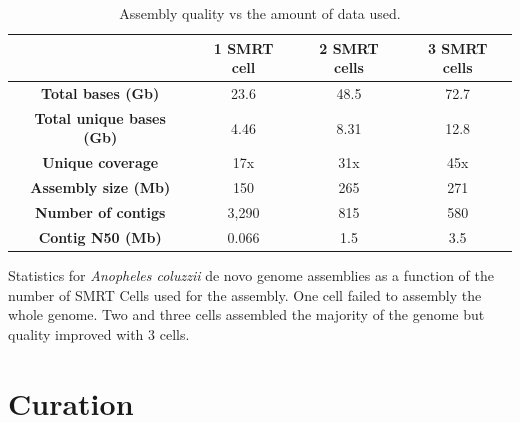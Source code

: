 \begin{table}[htbp!]
\caption{Assembly quality vs the amount of data used.}\label{table:smrtcells}
\begin{tabular}{| c | c | c | c |}
\hline
 & \textbf{1 SMRT cell} & \textbf{2 SMRT cells} & \textbf{3 SMRT cells} \\\hline
 \textbf{Total bases (Gb)} & 23.6 & 48.5 & 72.7 \\\hline
  \textbf{Total unique bases (Gb)} & 4.46 & 8.31 & 12.8 \\\hline 
  \textbf{Unique coverage} & 17x & 31x & 45x \\\hline 
  \textbf{Assembly size (Mb)} & 150 & 265 & 271 \\\hline 
  \textbf{Number of contigs} & 3,290 & 815 & 580 \\\hline 
  \textbf{Contig N50 (Mb)} & 0.066 & 1.5 & 3.5 \\\hline
\end{tabular}
\par{Statistics for \textit{Anopheles coluzzii} de novo genome assemblies as a function of the number of
SMRT Cells used for the assembly. One cell failed to assembly the whole genome. Two and three cells assembled the majority of the genome but quality improved with 3 cells.}
\end{table}




\section{Curation}

